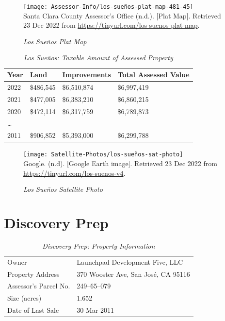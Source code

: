 \begin{figure}[hbt]
  \caption[Los Sueños Plat Map]{\textit{Los Sueños Plat Map}}\label{fig:los-sueños-plat-map}
  \texttt{[image: Assessor-Info/los-sueños-plat-map-481-45]}\\ %
  \footnotesize{Santa Clara County Assessor's Office (n.d.). [Plat Map]. Retrieved 23 Dec 2022 from  \url{https://tinyurl.com/los-suenos-plat-map}}.
\end{figure}

\begin{table}[hbt]
  \SingleSpacing%
  \caption[Los Sueños: Taxable Amount of Assessed Propery]{\textit{Los Sueños: Taxable Amount of Assessed Property}}\label{tab:los-sueños-taxable-amount}
  \begin{tabular}{llll}
    \toprule
    Year & Land      & Improvements & Total Assessed Value \\
    \midrule
    2022 & \$486,545 & \$6,510,874  & \$6,997,419 \\
    2021 & \$477,005 & \$6,383,210  & \$6,860,215 \\
    2020 & \$472,114 & \$6,317,759  & \$6,789,873 \\
    \ldots \\
    2011 & \$906,852 &\$5,393,000   & \$6,299,788 \\
    \bottomrule
  \end{tabular}
\end{table}

\begin{figure}[hbt]
  \caption[Los Sueños Satellite Photo]{\textit{Los Sueños Satellite Photo}}\label{fig:los-sueños-sat-photo}
  \texttt{[image: Satellite-Photos/los-sueños-sat-photo]}\\ %
  \footnotesize{Google. (n.d). [Google Earth image]. Retrieved 23 Dec 2022 from \url{https://tinyurl.com/los-suenos-v4}.}
\end{figure}


\clearpage
\section{Discovery Prep}\label{sec:discover-prep-info}
\begin{table}[htb]
  \SingleSpacing%
  \caption[Discovery Prep: Property Information]{\textit{Discovery Prep: Property Information}}\label{tab:discovery-prep-prop-info}
  \begin{tabular}{ll}
    \toprule
    Owner                 & Launchpad Development Five, LLC \\
    Property Address      & 370 Wooster Ave, San José, CA 95116 \\
    Assessor's Parcel No. &  249–65–079 \\
    Size (acres)          & 1.652 \\
    Date of Last Sale     & 30 Mar 2011\\
    \bottomrule
  \end{tabular}
\end{table}

